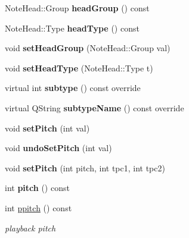 \begin{DoxyCompactItemize}
Note\+Head\+::\+Group {\bfseries head\+Group} () const
\item 
\mbox{\label{class_ms_1_1_note_a313b101f15dd05bb416d8e29070b4add}} 
Note\+Head\+::\+Type {\bfseries head\+Type} () const
\item 
\mbox{\label{class_ms_1_1_note_ad0e73a30df1e32e9dcdc0b36580e853c}} 
void {\bfseries set\+Head\+Group} (Note\+Head\+::\+Group val)
\item 
\mbox{\label{class_ms_1_1_note_add88c356d97cc3a42374c29ddb8ada28}} 
void {\bfseries set\+Head\+Type} (Note\+Head\+::\+Type t)
\item 
\mbox{\label{class_ms_1_1_note_a0b1458a7c7979af58f326400324daad0}} 
virtual int {\bfseries subtype} () const override
\item 
\mbox{\label{class_ms_1_1_note_a171271218a44ccc6979fa222604c2cba}} 
virtual Q\+String {\bfseries subtype\+Name} () const override
\item 
\mbox{\label{class_ms_1_1_note_ac88696674088bba6493e11f97d09800d}} 
void {\bfseries set\+Pitch} (int val)
\item 
\mbox{\label{class_ms_1_1_note_a7bb50238cfa286f57987d2aa8a9917a1}} 
void {\bfseries undo\+Set\+Pitch} (int val)
\item 
\mbox{\label{class_ms_1_1_note_a873e34c368a60fd0028f1df9cd41c717}} 
void {\bfseries set\+Pitch} (int pitch, int tpc1, int tpc2)
\item 
\mbox{\label{class_ms_1_1_note_adb609dbbd1f11ba96c09c01d49fa63bd}} 
int {\bfseries pitch} () const
\item 
\mbox{\label{class_ms_1_1_note_a4931518c8ec3e9bf6c4a7269f3d3295d}} 
int \hyperlink{class_ms_1_1_note_a4931518c8ec3e9bf6c4a7269f3d3295d}{ppitch} () const
\begin{DoxyCompactList}\small\item\em playback pitch \end{DoxyCompactList}\item 

\end{DoxyCompactItemize}
